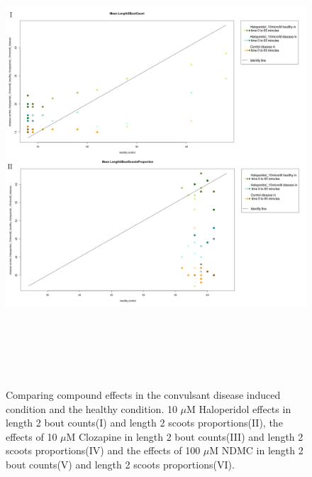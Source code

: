 \documentclass[a4paper,12pt]{article}
\begin{document}
\newpage
\begin{figure}[h!]
\begin{center}
\caption{Comparing compound effects in the convulsant disease induced condition and the healthy condition. 10 $\mu$M Haloperidol effects in length 2 bout counts(I) and length 2 scoots proportions(II), the effects of 10 $\mu$M Clozapine in length 2 bout counts(III) and length 2 scoots proportions(IV) and the effects of 100 $\mu$M NDMC in length 2 bout counts(V) and length 2 scoots proportions(VI).}
\includegraphics[width=15cm,height=17cm]{PTZCountScootsH.png}
\end{center}
\end{figure}
\newpage
\end{document}
